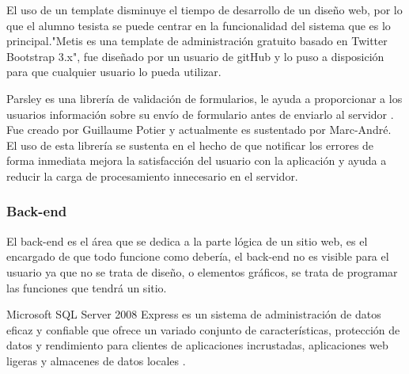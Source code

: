 El uso de un template disminuye el tiempo de desarrollo de un diseño web, por lo que el alumno tesista se puede centrar en la funcionalidad del sistema que es lo principal."Metis es una  template de administración gratuito basado en Twitter Bootstrap 3.x"\cite{git15}, fue diseñado por un usuario de gitHub y lo puso a disposición para que cualquier usuario lo pueda utilizar.


 Parsley es una librería de validación de formularios, le ayuda a proporcionar a los usuarios información sobre su envío de formulario antes de enviarlo al servidor \cite{PAR15}. Fue creado por Guillaume Potier y actualmente es sustentado por Marc-André. 
\\

El uso de esta librería se sustenta en el hecho de que notificar los errores de forma inmediata  mejora la satisfacción del usuario con la aplicación y ayuda a reducir la carga de procesamiento innecesario en el servidor.

\subsubsection{Back-end}

El back-end es el área que se dedica a la parte lógica de un sitio web, es el encargado de que todo funcione como debería, el back-end no es visible para el usuario ya que no se trata de diseño, o elementos gráficos, se trata de programar las funciones que tendrá un sitio.


Microsoft SQL Server 2008 Express es un sistema de administración de datos eficaz y confiable que ofrece un variado conjunto de características, protección de datos y rendimiento para clientes de aplicaciones incrustadas, aplicaciones web ligeras y almacenes de datos locales \cite{mic15}.


